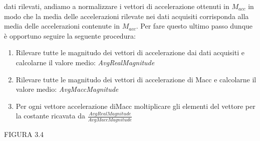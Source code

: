 dati rilevati, andiamo a normalizzare i vettori di accelerazione ottenuti in $M_{acc}$
in modo che la media delle accelerazioni rilevate nei dati acquisiti corrisponda
alla media delle accelerazioni contenute in $M_{acc}$. Per fare questo ultimo passo
dunque \`e opportuno seguire la seguente procedura:
\begin{enumerate}
\item Rilevare tutte le magnitudo dei vettori di accelerazione dai dati acquisiti
e calcolarne il valore medio: \textit{AvgRealMagnitude}
\item Rilevare tutte le magnitudo dei vettori di accelerazione di Macc e calcolarne
il valore medio: \textit{AvgMaccMagnitude}
\item Per ogni vettore accelerazione diMacc moltiplicare gli elementi del vettore
per la costante ricavata da $\frac{AvgRealMagnitude}{AvgMaccMagnitude}$
\end{enumerate}
FIGURA 3.4


